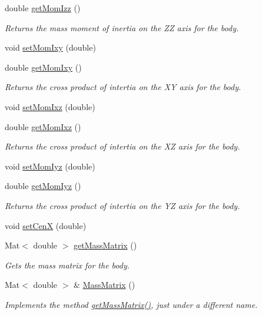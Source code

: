 \begin{DoxyCompactItemize}
double \hyperlink{class_body_a00f9b6c0dfc59de42bb4ba6eaa80d707}{get\-Mom\-Izz} ()
\begin{DoxyCompactList}\small\item\em Returns the mass moment of inertia on the Z\-Z axis for the body. \end{DoxyCompactList}\item 
void \hyperlink{class_body_ad21041419756e97484ef399181e4b668}{set\-Mom\-Ixy} (double)
\item 
double \hyperlink{class_body_ad441c69196f118ba60f51951e82a5929}{get\-Mom\-Ixy} ()
\begin{DoxyCompactList}\small\item\em Returns the cross product of intertia on the X\-Y axis for the body. \end{DoxyCompactList}\item 
void \hyperlink{class_body_ab76083304777794dd27769e1a35955b5}{set\-Mom\-Ixz} (double)
\item 
double \hyperlink{class_body_a6f9191a86fe6be241aa2278186926767}{get\-Mom\-Ixz} ()
\begin{DoxyCompactList}\small\item\em Returns the cross product of intertia on the X\-Z axis for the body. \end{DoxyCompactList}\item 
void \hyperlink{class_body_a21a26c218ddbb7ee5b20e9ccdb0736f7}{set\-Mom\-Iyz} (double)
\item 
double \hyperlink{class_body_afa233bb2f555c54ca2697f796548668e}{get\-Mom\-Iyz} ()
\begin{DoxyCompactList}\small\item\em Returns the cross product of intertia on the Y\-Z axis for the body. \end{DoxyCompactList}\item 
void \hyperlink{class_body_aeaacc5db3052196de8a6f7f61a8b6278}{set\-Cen\-X} (double)
\item 
Mat$<$ double $>$ \hyperlink{class_body_a4201150aa57d9d6f3aa245d8eca231d3}{get\-Mass\-Matrix} ()
\begin{DoxyCompactList}\small\item\em Gets the mass matrix for the body. \end{DoxyCompactList}\item 
Mat$<$ double $>$ \& \hyperlink{class_body_acb2895e81a595c7d168db48ff5dc766c}{Mass\-Matrix} ()
\begin{DoxyCompactList}\small\item\em Implements the method \hyperlink{class_body_a4201150aa57d9d6f3aa245d8eca231d3}{get\-Mass\-Matrix()}, just under a different name. \end{DoxyCompactList}\item 

\end{DoxyCompactItemize}

